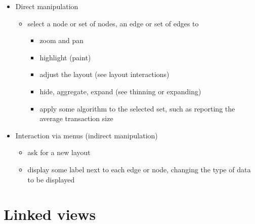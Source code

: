 \documentclass[11pt]{article}
\begin{document}
\begin{itemize} \itemsep 0em
\item Direct manipulation

  \begin{itemize} \itemsep 0em
  \item select a node or set of nodes, an edge or set of edges to
    \begin{itemize} \itemsep 0em
     \item zoom and pan
     \item highlight (paint)
     \item adjust the layout (see layout interactions)
     \item hide, aggregate, expand (see thinning or expanding)
     \item apply some algorithm to the selected set, such as 
           reporting the average transaction size
     \end{itemize}


 \end{itemize}

\item Interaction via menus (indirect manipulation)

  \begin{itemize} \itemsep 0em
   \item ask for a new layout
   \item display some label next to each edge or node,
         changing the type of data to be displayed
  \end{itemize}

\end{itemize}


\section {Linked views}
\end{document}
